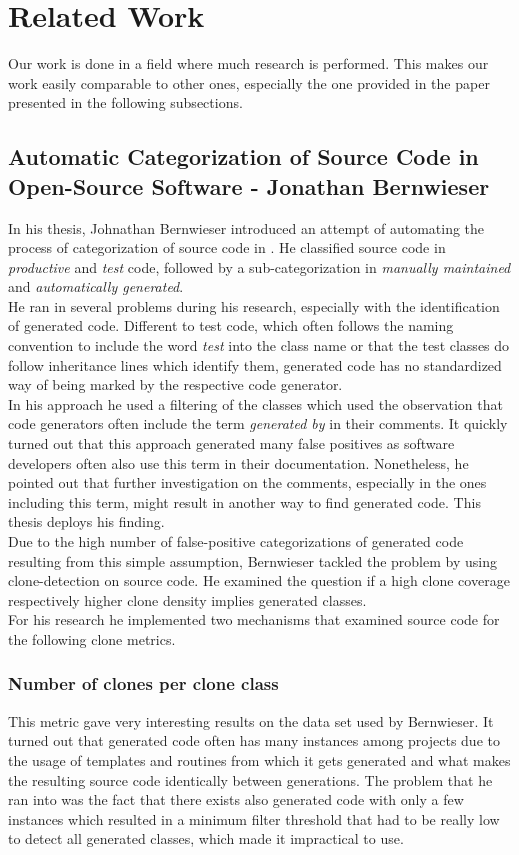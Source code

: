 \chapter{Related Work}\label{chapter:related}
Our work is done in a field where much research is performed. This makes our work easily comparable to other ones, especially the one provided in the paper presented in the following subsections.
\section{Automatic Categorization of Source Code in Open-Source Software - Jonathan Bernwieser}
In his thesis, Johnathan Bernwieser introduced an attempt of automating the process of categorization of source code in \cite{Bernwieser2014}. He classified source code in \textit{productive} and \textit{test} code, followed by a sub-categorization in \textit{manually maintained} and \textit{automatically generated}.\\
He ran in several problems during his research, especially with the identification of generated code. Different to test code, which often follows the naming convention to include the word \textit{test} into the class name or that the test classes do follow inheritance lines which identify them, generated code has no standardized way of being marked by the respective code generator.\\
In his approach he used a filtering of the classes which used the observation that code generators often include the term \textit{generated by} in their comments. It quickly turned out that this approach generated many false positives as software developers often also use this term in their documentation. Nonetheless, he pointed out that further investigation on the comments, especially in the ones including this term, might result in another way to find generated code. This thesis deploys his finding. \\
Due to the high number of false-positive categorizations of generated code resulting from this simple assumption, Bernwieser tackled the problem by using clone-detection on source code. He examined the question if a high clone coverage respectively higher clone density implies generated classes.\\
For his research he implemented two mechanisms that examined source code for the following clone metrics.

\subsection{Number of clones per clone class}
This metric gave very interesting results on the data set used by Bernwieser. It turned out that generated code often has many instances among projects due to the usage of templates and routines from which it gets generated and what makes the resulting source code identically between generations. The problem that he ran into was the fact that there exists also generated code with only a few instances which resulted in a minimum filter threshold that had to be really low to detect all generated classes, which made it impractical to use.

